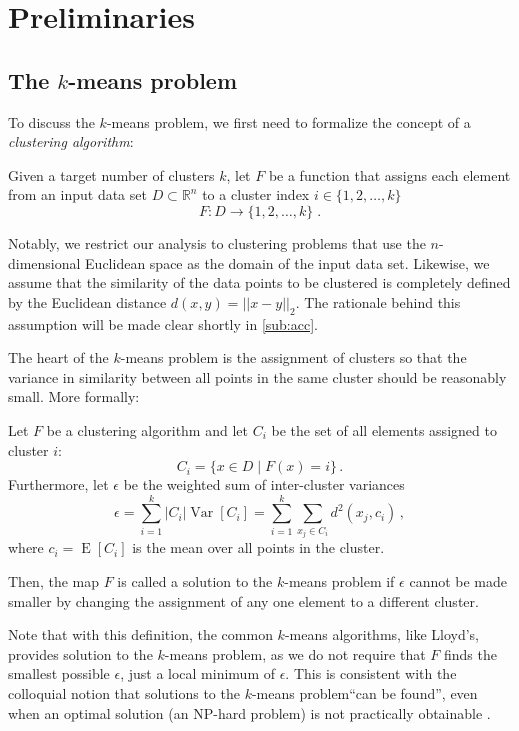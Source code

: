\newcommand{\kmeans}{$k$-means problem\xspace}

\section{Preliminaries}

\lipsum[23]


\subsection{The \kmeans}

To discuss the \kmeans, we first need to formalize the concept of a \emph{clustering algorithm}:
\begin{definition}
	Given a target number of clusters $k$,
  let $F$ be a function that assigns each element from an input data set $D\subset \mathbb{R}^n$ to a
	cluster index $i \in \{1, 2, \ldots, k\}$
	$$ F:D \to \{1, 2, \ldots, k\} \;.$$
\end{definition}
Notably, we restrict our analysis to clustering problems that use the $n$-dimensional Euclidean space as the domain of the input data set.
Likewise, we assume that the similarity of the data points to be clustered is completely defined by the Euclidean distance $d(x,y)= || x-y ||_2 $.
The rationale behind this assumption will be made clear shortly in \autoref{sub:acc}.

The heart of the \kmeans is the assignment of clusters so that the variance in similarity between all points in the same cluster should be reasonably small.
More formally:
\begin{definition}[\kmeans]
	Let $F$ be a clustering algorithm
	and let $C_i$ be the set of all elements assigned to cluster $i$:
	$$ C_i = \{x \in D \mid F(x) = i\} \,.$$
	Furthermore, let $\epsilon$ be the weighted sum of inter-cluster variances
	$$ \epsilon = \sum_{i=1}^k |C_i| \operatorname{Var}[C_i] = \sum_{i=1}^k \sum_{x_j \in C_i}  d^2(x_j, c_i)\,, $$
	where $c_i = \operatorname{E}[C_i]$ is the mean over all points in the cluster.

	Then, the map $F$ is called a solution to the \kmeans
	if $\epsilon$ cannot be made smaller by changing the assignment of any one element to a different cluster.
\end{definition}
Note that with this definition, the common $k$-means algorithms, like Lloyd's, provides solution to the \kmeans,
as we do not require that $F$ finds the smallest possible $\epsilon$,
just a local minimum of $\epsilon$.
This is consistent with the colloquial notion that solutions to the \kmeans ``can be found'',
even when an optimal solution (an NP-hard problem) is not practically obtainable \cite{}.

